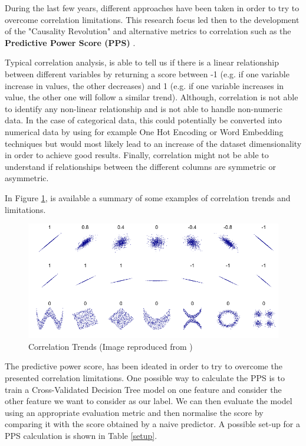 \begin{appendices}
During the last few years, different approaches have been taken in order to try to overcome correlation limitations. This research focus led then to the development of the "Causality Revolution" and alternative metrics to correlation such as the \textbf{Predictive Power Score (PPS)} \cite{ppc}.

Typical correlation analysis, is able to tell us if there is a linear relationship between different variables by returning a score between -1 (e.g. if one variable increase in values, the other decreases) and 1 (e.g. if one variable increases in value, the other one will follow a similar trend). Although, correlation is not able to identify any non-linear relationship and is not able to handle non-numeric data. In the case of categorical data, this could potentially be converted into numerical data by using for example One Hot Encoding or Word Embedding techniques but would most likely lead to an increase of the dataset dimensionality in order to achieve good results. Finally, correlation might not be able to understand if relationships between the different columns are symmetric or asymmetric.

In Figure \ref{corr_t}, is available a summary of some examples of correlation trends and limitations.

\vspace{-0.1cm}
\begin{figure}[ht!]%
    \centering
    \includegraphics[width=0.85\linewidth]{latex/images/corr.pdf}
    \vspace{-0.2cm}
    \caption{Correlation Trends (Image reproduced from \cite{corr_trends})}
    \label{corr_t}
\end{figure}
\vspace{-0.5cm}

The predictive power score, has been ideated in order to try to overcome the presented correlation limitations. One possible way to calculate the PPS is to train a Cross-Validated Decision Tree model on one feature and consider the other feature we want to consider as our label. We can then evaluate the model using an appropriate evaluation metric and then normalise the score by comparing it with the score obtained by a naive predictor. A possible set-up for a PPS calculation is shown in Table \ref{setup}.


\end{appendices}
